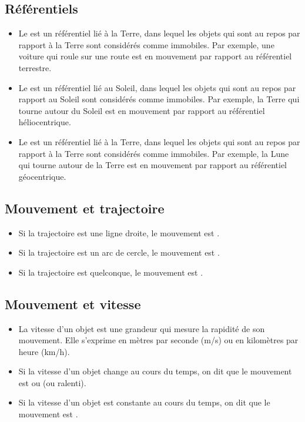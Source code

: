 \documentclass[12pt]{article}
\begin{document}
\subsection{Référentiels}
\begin{itemize}
        \item Le  est un référentiel lié à la Terre, dans lequel les objets qui sont au repos par rapport à la Terre sont considérés comme immobiles. Par exemple, une voiture qui roule sur une route est en mouvement par rapport au référentiel terrestre.
        \item Le  est un référentiel lié au Soleil, dans lequel les objets qui sont au repos par rapport au Soleil sont considérés comme immobiles. Par exemple, la Terre qui tourne autour du Soleil est en mouvement par rapport au référentiel héliocentrique.
        \item Le  est un référentiel lié à la Terre, dans lequel les objets qui sont au repos par rapport à la Terre sont considérés comme immobiles. Par exemple, la Lune qui tourne autour de la Terre est en mouvement par rapport au référentiel géocentrique.
\end{itemize}

\subsection{Mouvement et trajectoire}
\begin{itemize}
    \item Si la trajectoire est une ligne droite, le mouvement est .
    \item Si la trajectoire est un arc de cercle, le mouvement est .
    \item Si la trajectoire est quelconque, le mouvement est .
\end{itemize}

\subsection{Mouvement et vitesse}
\begin{itemize}
    \item La vitesse d’un objet est une grandeur qui mesure la rapidité de son mouvement. Elle s’exprime en mètres par seconde (m/s) ou en kilomètres par heure (km/h).
    \item Si la vitesse d’un objet change au cours du temps, on dit que le mouvement est  ou  (ou ralenti).
    \item Si la vitesse d’un objet est constante au cours du temps, on dit que le mouvement est .
\end{itemize}
\end{document}
